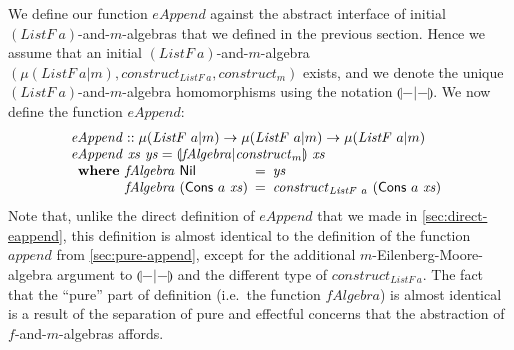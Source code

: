 \documentclass{jfp1}
\newcommand{\eFold}[2]{\llparenthesis #1|#2 \rrparenthesis}
\begin{document}
We define our function $\mathit{eAppend}$ against the abstract
interface of initial $(\mathit{ListF}~a)$-and-$m$-algebras that we
defined in the previous section. Hence we assume that an initial
$(\mathit{ListF}~a)$-and-$m$-algebra $(\mu(\mathit{ListF}~a|m),
\mathit{construct}_{\mathit{ListF}~a}, \mathit{construct}_m)$ exists,
and we denote the unique $(\mathit{ListF}~a)$-and-$m$-algebra
homomorphisms using the notation $\eFold{-}{-}$. We now define the
function $\mathit{eAppend}$:
\begin{displaymath}
  \begin{array}{l}
    \mathit{eAppend} :: \mu(\mathit{ListF}~a|m) \to \mu(\mathit{ListF}~a|m) \to \mu(\mathit{ListF}~a|m) \\
    \mathit{eAppend}~\mathit{xs}~\mathit{ys} = \eFold{\mathit{fAlgebra}}{\mathit{construct}_m}~\mathit{xs} \\
    \begin{array}{r@{\hspace{0.4em}}l@{\hspace{0.5em}}c@{\hspace{0.5em}}l}
      \textbf{where} & \mathit{fAlgebra}~\mathsf{Nil} &=& \mathit{ys} \\
                     & \mathit{fAlgebra}~(\mathsf{Cons}~a~\mathit{xs}) &=& \mathit{construct}_{\mathit{ListF}~a}~(\mathsf{Cons}~a~\mathit{xs})      
    \end{array}
  \end{array}
\end{displaymath}
Note that, unlike the direct definition of $\mathit{eAppend}$ that we
made in \autoref{sec:direct-eappend}, this definition is almost
identical to the definition of the function $\mathit{append}$ from
\autoref{sec:pure-append}, except for the additional
$m$-Eilenberg-Moore-algebra argument to $\eFold{-}{-}$ and the
different type of $\mathit{construct}_{\mathit{ListF}~a}$. The fact
that the ``pure'' part of definition (i.e.~the function
$\mathit{fAlgebra}$) is almost identical is a result of the separation
of pure and effectful concerns that the abstraction of
$f$-and-$m$-algebras affords.
\end{document}
